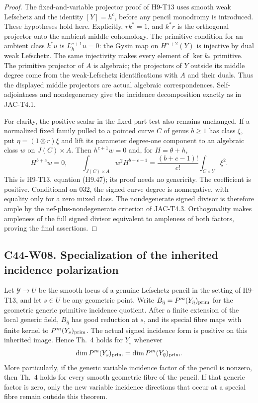 \begin{proof}
The fixed-and-variable projector proof of H9-T13 uses smooth weak
Lefschetz and the identity $[Y]=h^c$, before any pencil monodromy is
introduced. These hypotheses hold here. Explicitly,
$rk^*=1$, and $k^*r$ is the orthogonal projector onto the ambient
middle cohomology. The primitive condition for an ambient class
$k^*u$ is $L_h^{c+1}u=0$: the Gysin map on $H^{n+2}(Y)$ is
injective by dual weak Lefschetz. The same injectivity makes every
element of $\ker k_*$ primitive. The primitive projector of $A$
is algebraic; the projectors of $Y$ outside its middle degree come
from the weak-Lefschetz identifications with $A$ and their duals.
Thus the displayed middle projectors are actual algebraic
correspondences. Self-adjointness and nondegeneracy give the
incidence decomposition exactly as in JAC-T4.1.

For clarity, the positive scalar in the fixed-part test also remains
unchanged. If a normalized fixed family pulled to a pointed curve
$C$ of genus $b\geq1$ has class $\xi$, put $\eta=(1\otimes r)\xi$
and lift its parameter degree-one component to an algebraic class
$w$ on $J(C)\times A$. Then $h^{c+1}w=0$ and, for
$H=\theta+h$,
\[
 H^{b+c}w=0,\qquad
 \int_{J(C)\times A}w^2H^{b+c-1}
   =\frac{(b+c-1)!}{c!}\int_{C\times Y}\xi^2.
\]
This is H9-T13, equation (H9.47); its proof needs no genericity.
The coefficient is positive. Conditional on 032, the signed curve
degree is nonnegative, with equality only for a zero mixed class.
The nondegenerate signed divisor is therefore ample by the
nef-plus-nondegenerate criterion of JAC-T4.3. Orthogonality makes
ampleness of the full signed divisor equivalent to ampleness of
both factors, proving the final assertions.
\end{proof}

\subsection*{C44-W08. Specialization of the inherited incidence polarization}

\begin{theorem}
Let $\mathscr Y\to U$ be the smooth locus of a genuine Lefschetz
pencil in the setting of H9-T13, and let $s\in U$ be any geometric
point. Write $B_{\bar\eta}=P^m(Y_{\bar\eta})_{\rm prim}$ for the
geometric generic primitive incidence quotient. After a finite
extension of the local generic field, $B_{\bar\eta}$ has good
reduction at $s$, and its special fibre maps with finite kernel to
$P^m(Y_s)_{\rm prim}$. The actual signed incidence form is positive
on this inherited image. Hence Th.~4 holds for $Y_s$ whenever
\begin{equation}\label{c44:no-incidence-jump}
 \dim P^m(Y_s)_{\rm prim}=\dim P^m(Y_{\bar\eta})_{\rm prim}.
\end{equation}
More particularly, if the generic variable incidence factor of the
pencil is nonzero, then Th.~4 holds for every smooth geometric fibre
of the pencil. If that generic factor is zero, only the new
variable incidence directions that occur at a special fibre remain
outside this theorem.
\end{theorem}

